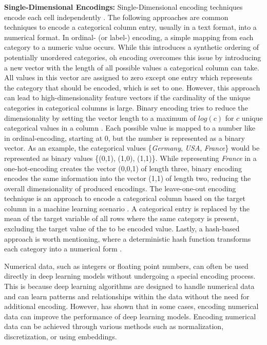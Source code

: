 \textbf{Single-Dimensional Encodings:}
Single-Dimensional encoding techniques encode each cell independently \cite{borisov2022DeepNeuralNetworks}.
The following approaches are common techniques to encode a categorical column entry, usually in a text format, into a numerical format.
In ordinal- (or label-) encoding, a simple mapping from each category to a numeric value occurs. 
While this introduces a synthetic ordering of potentially unordered categories, \gls{oh} encoding overcomes this issue by introducing a new vector with the length of all possible values a categorical column can take.
All values in this vector are assigned to zero except one entry which represents the category that should be encoded, which is set to one.
However, this approach can lead to high-dimensionality feature vectors if the cardinality of the unique categories in categorical columns is large.
Binary encoding tries to reduce the dimensionality by setting the vector length to a maximum of $log(c)$ for $c$ unique categorical values in a column \cite{borisov2022DeepNeuralNetworks}.
Each possible value is mapped to a number like in ordinal-encoding, starting at 0, but the number is represented as a binary vector.
As an example, the categorical values \{\textit{Germany}, \textit{USA}, \textit{France}\} would be represented as binary values \{(0,1), (1,0), (1,1)\}. 
While representing \textit{France} in a one-hot-encoding creates the vector (0,0,1) of length three, binary encoding encodes the same information into the vector (1,1) of length two, reducing the overall dimensionality of produced encodings.
The leave-one-out encoding technique is an approach to encode a categorical column based on the target column in a machine learning scenario \cite{borisov2022DeepNeuralNetworks}. 
A categorical entry is replaced by the mean of the target variable of all rows where the same category is present, excluding the target value of the to be encoded value.
Lastly, a hash-based approach is worth mentioning, where a deterministic hash function transforms each category into a numerical form \cite{borisov2022DeepNeuralNetworks}.

Numerical data, such as integers or floating point numbers, can often be used directly in deep learning models without undergoing a special encoding process. 
This is because deep learning algorithms are designed to handle numerical data and can learn patterns and relationships within the data without the need for additional encoding.
However, \textcite{gorishniy2022EmbeddingsNumericalFeatures} has shown that in some cases, encoding numerical data can improve the performance of deep learning models. 
Encoding numerical data can be achieved through various methods such as normalization, discretization, or using embeddings.


